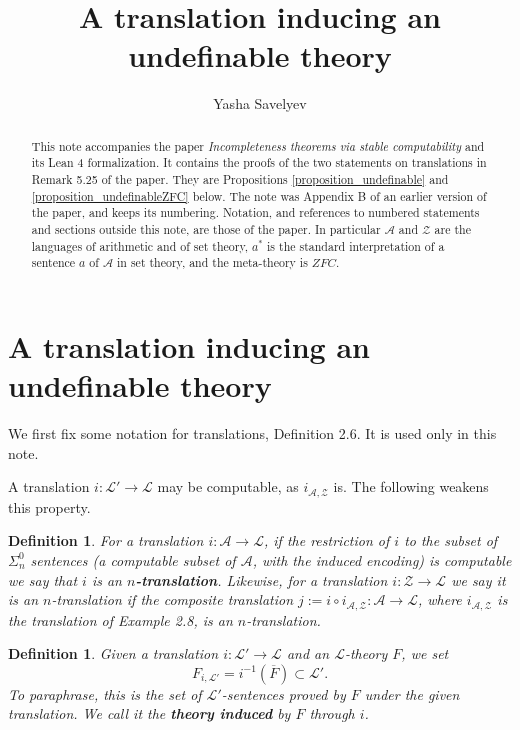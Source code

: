 \documentclass{amsart}  %
\numberwithin{equation}{section}
\newtheorem{definition}[equation]{Definition}
\theoremstyle{definition}
\theoremstyle{remark}
\begin{document}
\title{A translation inducing an undefinable theory}
\author{Yasha Savelyev}
\begin{abstract}
This note accompanies the paper \emph{Incompleteness theorems via stable computability} and its Lean 4 formalization. It contains the proofs of the two statements on translations in Remark 5.25 of the paper. They are Propositions \ref{proposition_undefinable} and \ref{proposition_undefinableZFC} below. The note was Appendix B of an earlier version of the paper, and keeps its numbering. Notation, and references to numbered statements and sections outside this note, are those of the paper. In particular $\mathcal{A}$ and $\mathcal{Z}$ are the languages of arithmetic and of set theory, $a ^{\ast}$ is the standard interpretation of a sentence $a$ of $\mathcal{A}$ in set theory, and the meta-theory is $ZFC$.
\end{abstract}
\maketitle
\setcounter{section}{1}
\renewcommand{\thesection}{\Alph{section}}
\section{A translation inducing an undefinable theory} \label{section_undefinable}
We first fix some notation for translations, Definition 2.6. It is used only in this note.

A translation $i: \mathcal{L}' \to \mathcal{L}$ may be computable, as $i _{\mathcal{A}, \mathcal{Z}}$ is. The following weakens this property.
\begin{definition}\label{definition_ntranslation}
 For
a translation $i: \mathcal{A} \to \mathcal{L} $, if the 
restriction of $i$ to the subset of $\Sigma ^{0} _{n}$
sentences (a computable subset of $\mathcal{A}$, with the induced encoding) is computable we say that $i$ is
an \textbf{\emph{$n$-translation}}. Likewise, for a translation $i: \mathcal{Z} \to \mathcal{L}$ we say it is an $n$-translation if the composite translation $j := i \circ i _{\mathcal{A}, \mathcal{Z}}: \mathcal{A} \to \mathcal{L}$, where $i _{\mathcal{A}, \mathcal{Z}}$ is the translation of Example 2.8, is an $n$-translation.
\end{definition}




\begin{definition}
\label{definition_inducedtheory} Given a translation $i: \mathcal{L}'
\to \mathcal{L} $ and an $\mathcal{L} $-theory $F$, we set $$F
_{i, \mathcal{L}'} = i ^{-1} (\overline{F}) \subset
\mathcal{L}'. $$ To paraphrase, this is the set of $\mathcal{L}'$-sentences proved by $F$ under the given translation. We call it the \textbf{\emph{theory induced}} by $F$ through $i$.
\end{definition}
\end{document}
